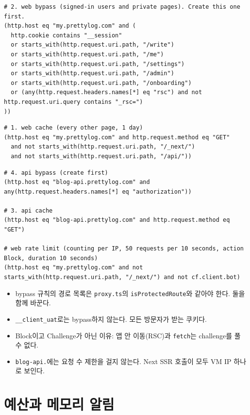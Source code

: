 \begin{lstlisting}
# 2. web bypass (signed-in users and private pages). Create this one first.
(http.host eq "my.prettylog.com" and (
  http.cookie contains "__session"
  or starts_with(http.request.uri.path, "/write")
  or starts_with(http.request.uri.path, "/me")
  or starts_with(http.request.uri.path, "/settings")
  or starts_with(http.request.uri.path, "/admin")
  or starts_with(http.request.uri.path, "/onboarding")
  or (any(http.request.headers.names[*] eq "rsc") and not http.request.uri.query contains "_rsc=")
))
\end{lstlisting}

\begin{lstlisting}
# 1. web cache (every other page, 1 day)
(http.host eq "my.prettylog.com" and http.request.method eq "GET"
  and not starts_with(http.request.uri.path, "/_next/")
  and not starts_with(http.request.uri.path, "/api/"))
\end{lstlisting}

\begin{lstlisting}
# 4. api bypass (create first)
(http.host eq "blog-api.prettylog.com" and any(http.request.headers.names[*] eq "authorization"))

# 3. api cache
(http.host eq "blog-api.prettylog.com" and http.request.method eq "GET")

# web rate limit (counting per IP, 50 requests per 10 seconds, action Block, duration 10 seconds)
(http.host eq "my.prettylog.com" and not starts_with(http.request.uri.path, "/_next/") and not cf.client.bot)
\end{lstlisting}

\begin{itemize}[nosep]
  \item bypass 규칙의 경로 목록은 \texttt{proxy.ts}의 \texttt{isProtectedRoute}와 같아야 한다. 둘을 함께 바꾼다.
  \item \texttt{\_\_client\_uat}로는 bypass하지 않는다. 모든 방문자가 받는 쿠키다.
  \item Block이고 Challenge가 아닌 이유: 앱 안 이동(RSC)과 \texttt{fetch}는 challenge를 풀 수 없다.
  \item \texttt{blog-api.}에는 요청 수 제한을 걸지 않는다. Next SSR 호출이 모두 VM IP 하나로 보인다.
\end{itemize}

\section{예산과 메모리 알림}\label{sec:A-alerts}

